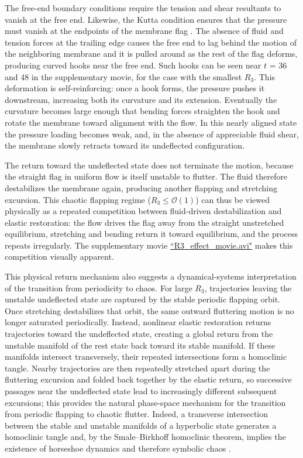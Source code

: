 \documentclass{article}[12pt]
\theoremstyle{Theorem}
\begin{document}
The free-end boundary conditions require the tension and shear resultants to vanish at the free end. Likewise, the Kutta condition ensures that the pressure must vanish at the endpoints of the membrane flag \cite{loo2025falling}. The absence of fluid and tension forces at the trailing edge causes the free end to lag behind the motion of the neighboring membrane and it is pulled around as the rest of the flag deforms, producing curved hooks near the free end. Such hooks can be seen near $t$ = 36 and 48 in the supplementary movie, for the case with the smallest $R_3$. This deformation is self-reinforcing: once a hook forms, the pressure pushes it downstream, increasing both its curvature and its extension. Eventually the curvature becomes large enough that bending forces straighten the hook and rotate the membrane toward alignment with the flow. In this nearly aligned state the pressure loading becomes weak, and, in the absence of appreciable fluid shear, the membrane slowly retracts toward its undeflected configuration. 
\newline

The return toward the undeflected state does not terminate the motion, because the straight flag in uniform flow is itself unstable to flutter. The fluid therefore destabilizes the membrane again, producing another flapping and stretching excursion. This chaotic flapping regime ($R_3 \le \mathcal{O}(1)$) can thus be viewed physically as a repeated competition between fluid-driven destabilization and elastic restoration: the flow drives the flag away from the straight unstretched equilibrium, stretching and bending return it toward equilibrium, and the process repeats irregularly. The supplementary movie \href{https://drive.google.com/file/d/1_z9MffwxBTtyBGtEEO2kDjkDcOf6o5Ns/view?usp=drive_link}{``R3\_effect\_movie.avi"} makes this competition visually apparent.
\newline

This physical return mechanism also suggests a dynamical-systems interpretation of the transition from periodicity to chaos. For large $R_3$, trajectories leaving the unstable undeflected state are captured by the stable periodic flapping orbit. Once stretching destabilizes that orbit, the same outward fluttering motion is no longer saturated periodically. Instead, nonlinear elastic restoration returns trajectories toward the undeflected state, creating a global return from the unstable manifold of the rest state back toward its stable manifold. If these manifolds intersect transversely, their repeated intersections form a homoclinic tangle. Nearby trajectories are then repeatedly stretched apart during the fluttering excursion and folded back together by the elastic return, so successive passages near the undeflected state lead to increasingly different subsequent excursions; this provides the natural phase-space mechanism for the transition from periodic flapping to chaotic flutter. Indeed, a transverse intersection between the stable and unstable manifolds of a hyperbolic state generates a homoclinic tangle and, by the Smale–Birkhoff homoclinic theorem, implies the existence of horseshoe dynamics and therefore symbolic chaos \cite{katok1995introduction, smale1967differentiable}.
\end{document}
